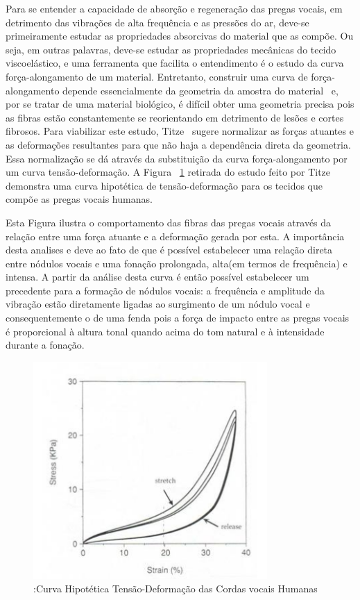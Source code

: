 	Para se entender a capacidade de absorção e regeneração das pregas vocais, em detrimento das vibrações de alta frequência e as pressões do ar, deve-se primeiramente estudar as propriedades absorcivas do material que as compõe. Ou seja, em outras palavras, deve-se estudar as propriedades mecânicas do tecido viscoelástico, e uma ferramenta que facilita o entendimento é o estudo da curva força-alongamento de um material. Entretanto, construir uma curva de força-alongamento depende essencialmente da geometria da amostra do material~\cite{IngoTitze} e, por se tratar de uma material biológico, é difícil obter uma geometria precisa pois as ﬁbras estão constantemente se reorientando em detrimento de lesões e cortes ﬁbrosos. Para viabilizar este estudo, Titze~\cite{IngoTitze} sugere normalizar as forças atuantes e as deformações resultantes para que não haja a dependência direta da geometria. Essa normalização se dá através da substituição da curva força-alongamento por um curva tensão-deformação. A Figura ~\ref{fig:curvaTensao} retirada do estudo feito por Titze ~\cite{IngoTitze} demonstra uma curva hipotética de tensão-deformação para os tecidos que compõe as pregas vocais humanas. 
	
	Esta Figura ilustra o comportamento das ﬁbras das pregas vocais através da relação entre uma força atuante e a deformação gerada por esta.
	 A importância desta analises e deve ao fato de que é possível estabelecer uma relação direta entre nódulos vocais e uma fonação prolongada, alta(em termos de frequência) e intensa. A partir da análise desta curva é então possível estabelecer um precedente para a formação de nódulos vocais: a frequência e amplitude da vibração estão diretamente ligadas ao surgimento de um nódulo vocal e consequentemente o de uma fenda pois a força de impacto entre as pregas vocais é proporcional à altura tonal quando acima do tom natural e à intensidade durante a fonação.
	
	\begin{figure}
		\centering		
		\includegraphics{figura1.png}
		\caption{:Curva Hipotética Tensão-Deformação das Cordas vocais Humanas~\cite{IngoTitze}}
		\label{fig:curvaTensao}
	\end{figure}
	
